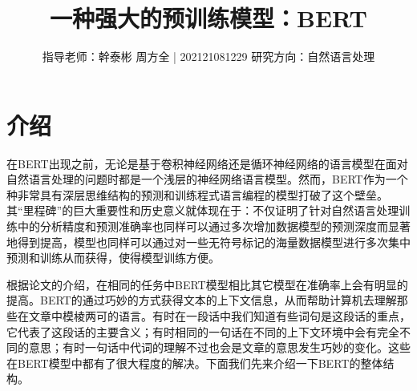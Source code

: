 \documentclass[]{article}
\title{一种强大的预训练模型：BERT}
\author{{\small 指导老师：幹泰彬 \quad\quad 周方全 | 202121081229 \quad\quad 研究方向：自然语言处理} }
\date{}
\begin{document}
\maketitle  %

\section{介绍}
在BERT出现之前，无论是基于卷积神经网络还是循环神经网络的语言模型在面对自然语言处理的问题时都是一个浅层的神经网络语言模型。然而，BERT作为一个种非常具有深层思维结构的预测和训练程式语言编程的模型打破了这个壁垒。其“里程碑”的巨大重要性和历史意义就体现在于：不仅证明了针对自然语言处理训练中的分析精度和预测准确率也同样可以通过多次增加数据模型的预测深度而显著地得到提高，模型也同样可以通过对一些无符号标记的海量数据模型进行多次集中预测和训练从而获得，使得模型训练方便。

根据论文\cite{devlin2018bert}的介绍，在相同的任务中BERT模型相比其它模型在准确率上会有明显的提高。BERT的通过巧妙的方式获得文本的上下文信息，从而帮助计算机去理解那些在文章中模棱两可的语言。有时在一段话中我们知道有些词句是这段话的重点，它代表了这段话的主要含义；有时相同的一句话在不同的上下文环境中会有完全不同的意思；有时一句话中代词的理解不过也会是文章的意思发生巧妙的变化。这些在BERT模型中都有了很大程度的解决。下面我们先来介绍一下BERT的整体结构。
\end{document}
